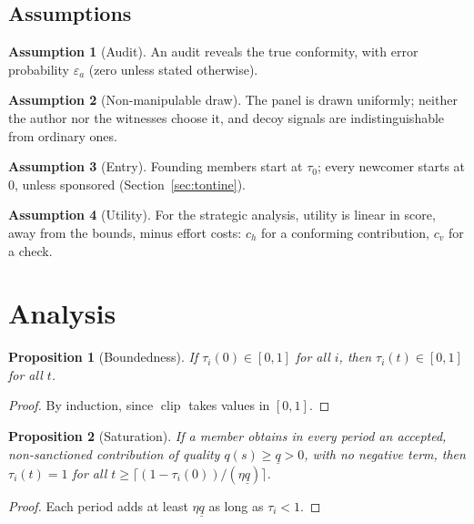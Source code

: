 \documentclass[11pt,a4paper]{article}
\theoremstyle{plain}
\newtheorem{proposition}{Proposition}
\theoremstyle{definition}
\newtheorem{assumption}{Assumption}
\theoremstyle{remark}
\newcommand{\clip}{\operatorname{clip}}
\newcommand{\1}{\mathbf{1}}
\begin{document}
\subsection{Assumptions}

\begin{assumption}[Audit]\label{h:audit}
An audit reveals the true conformity, with error probability $\varepsilon_a$
(zero unless stated otherwise).
\end{assumption}
\begin{assumption}[Non-manipulable draw]\label{h:draw}
The panel is drawn uniformly; neither the author nor the witnesses choose it,
and decoy signals are indistinguishable from ordinary ones.
\end{assumption}
\begin{assumption}[Entry]\label{h:entry}
Founding members start at $\tau_0$; every newcomer starts at 0, unless
sponsored (Section~\ref{sec:tontine}).
\end{assumption}
\begin{assumption}[Utility]\label{h:lin}
For the strategic analysis, utility is linear in score, away from the bounds,
minus effort costs: $c_h$ for a conforming contribution, $c_v$ for a check.
\end{assumption}

\section{Analysis}
\label{sec:analysis}

\begin{proposition}[Boundedness]
If $\tau_i(0)\in[0,1]$ for all $i$, then $\tau_i(t)\in[0,1]$ for all $t$.
\end{proposition}
\begin{proof}
By induction, since $\clip$ takes values in $[0,1]$.
\end{proof}

\begin{proposition}[Saturation]\label{prop:sat}
If a member obtains in every period an accepted, non-sanctioned contribution of
quality $q(s)\ge\underline q>0$, with no negative term, then $\tau_i(t)=1$ for
all $t\ge\lceil(1-\tau_i(0))/(\eta\underline q)\rceil$.
\end{proposition}
\begin{proof}
Each period adds at least $\eta\underline q$ as long as $\tau_i<1$.
\end{proof}
\end{document}

